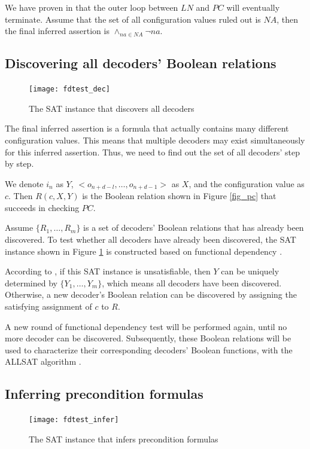 \documentclass[runningheads,a4paper]{llncs}
\begin{document}
We have proven in  that the outer loop between $LN$ and $PC$ will eventually terminate.
Assume that the set of all configuration values ruled out is $NA$,
then the final inferred assertion is $\wedge_{na\in NA}\neg na$.

\subsection{Discovering all decoders' Boolean relations}

\begin{figure}[b]
\centering
\texttt{[image: fdtest\_dec]}
\caption{The SAT instance that discovers all decoders}
\label{fig_fdtest_dec}
\end{figure}

The final inferred assertion is a formula that actually contains many different configuration values.
This means that multiple decoders may exist simultaneously for this inferred assertion.
Thus,
we need to find out the set of all decoders' step by step.

We denote $i_n$ as $Y$,
$<o_{n+d-l},\dots,o_{n+d-1}>$ as $X$,
and the configuration value as $c$.
Then $R(c,X,Y)$ is the Boolean relation shown in Figure \ref{fig_pc} that succeeds in checking $PC$.

Assume $\{R_1,\dots,R_{m}\}$ is a set of decoders' Boolean relations that has already been discovered.
To test whether all decoders have already been discovered,
the SAT instance shown in Figure \ref{fig_fdtest_dec} is constructed based on functional dependency .



According to ,
if this SAT instance is unsatisfiable,
then $Y$ can be uniquely determined by $\{Y_1,\dots,Y_m\}$,
which means all decoders have been discovered.
Otherwise,
a new decoder's Boolean relation can be discovered by assigning the satisfying assignment of $c$ to $R$.

A new round of functional dependency test will be performed again,
until no more decoder can be discovered.
Subsequently,
these Boolean relations will be used to characterize their corresponding decoders' Boolean functions,
with the ALLSAT algorithm .

\subsection{Inferring precondition formulas}
\begin{figure}[b]
\centering
\texttt{[image: fdtest\_infer]}
\caption{The SAT instance that infers precondition formulas}
\label{fig_fdtest_infer}
\end{figure}
\end{document}
